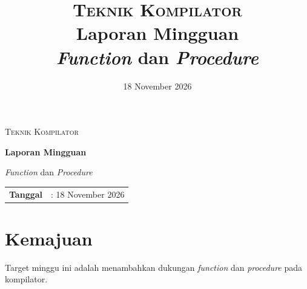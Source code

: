 \documentclass[11pt,a4paper]{article}
\title{
  \vspace{-1.5cm}
  {\Large\scshape Teknik Kompilator}\\[0.35cm]
  {\Huge\bfseries Laporan Mingguan}\\[0.35cm]
  {\LARGE \textit{Function} dan \textit{Procedure}}
}
\author{}
\date{18 November 2026}
\begin{document}
\hypersetup{pageanchor=false}
\begin{titlepage}
\centering
\thispagestyle{empty}

\vspace*{2.2cm}
{\Large\scshape Teknik Kompilator\par}

\vspace{1.8cm}
{\Huge\bfseries Laporan Mingguan\par}
\vspace{0.7cm}
{\LARGE \textit{Function} dan \textit{Procedure}\par}

\vspace{2.2cm}
\begin{tabular}{>{\bfseries}rl}
Tanggal     & : 18 November 2026 \\[0.35cm]
\end{tabular}

\vfill

\vspace{1.2cm}
\end{titlepage}
\setcounter{page}{2}
\hypersetup{pageanchor=true}

\tableofcontents
\newpage


\section{Kemajuan}

Target minggu ini adalah menambahkan dukungan \textit{function} dan
\textit{procedure} pada kompilator.
\end{document}
